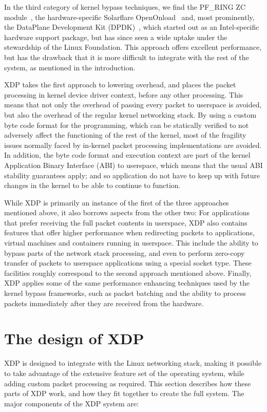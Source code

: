 \documentclass[10pt,sigconf,anonymous]{acmart}
\begin{document}
In the third category of kernel bypass techniques, we find the PF\_RING ZC
module~\cite{pfringzc}, the hardware-specific Solarflare
OpenOnload~\cite{openonload} and, most prominently, the DataPlane Development
Kit (DPDK)~\cite{dpdk}, which started out as an Intel-specific hardware support
package, but has since seen a wide uptake under the stewardship of the Linux
Foundation. This approach offers excellent performance, but has the drawback
that it is more difficult to integrate with the rest of the system, as mentioned
in the introduction.

XDP takes the first approach to lowering overhead, and places the packet
processing in kernel device driver context, before any other processing. This
means that not only the overhead of passing every packet to userspace is
avoided, but also the overhead of the regular kernel networking stack. By using
a custom byte code format for the programming, which can be statically verified
to not adversely affect the functioning of the rest of the kernel, most of the
fragility issues normally faced by in-kernel packet processing implementations
are avoided. In addition, the byte code format and execution context are part of
the kernel Application Binary Interface (ABI) to userspace, which means that the
usual ABI stability guarantees apply; and so application do not have to keep up
with future changes in the kernel to be able to continue to function.

While XDP is primarily an instance of the first of the three approaches mentioned
above, it also borrows aspects from the other two: For applications that prefer
receiving the full packet contents in userspace, XDP also contains features that
offer higher performance when redirecting packets to applications, virtual
machines and containers running in userspace. This include the ability to bypass
parts of the network stack processing, and even to perform zero-copy transfer of
packets to userspace applications using a special socket type. These facilities
roughly correspond to the second approach mentioned above. Finally, XDP applies
some of the same performance enhancing techniques used by the kernel bypass
frameworks, such as packet batching and the ability to process packets
immediately after they are received from the hardware.

\section{The design of XDP}
\label{sec:design}
XDP is designed to integrate with the Linux networking stack, making it possible
to take advantage of the extensive feature set of the operating system, while
adding custom packet processing as required. This section describes how these
parts of XDP work, and how they fit together to create the full system. The
major components of the XDP system are:
\end{document}
